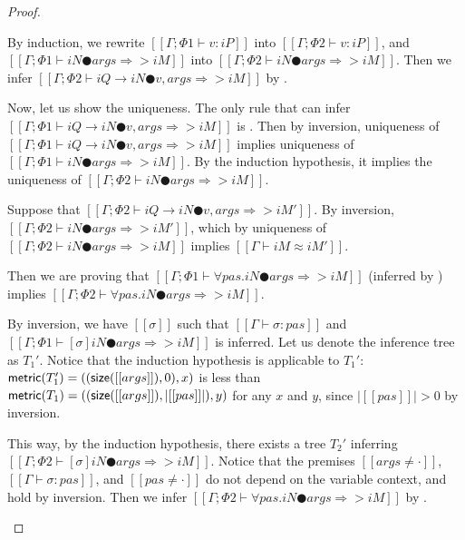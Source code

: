 \begin{proof}
\begin{caseof}
            By induction, we rewrite $[[Γ ; Φ1 ⊢ v : iP]]$ into $[[Γ ; Φ2 ⊢ v : iP]]$, 
            and $[[Γ ; Φ1 ⊢ iN ● args ⇒> iM]]$ into $[[Γ ; Φ2 ⊢ iN ● args ⇒> iM]]$.
            Then we infer $[[Γ ; Φ2 ⊢ iQ → iN ● v, args ⇒> iM]]$ by .

            Now, let us show the uniqueness.
            The only rule that can infer $[[Γ ; Φ1 ⊢ iQ → iN ● v, args ⇒> iM]]$
            is .
            Then by inversion, 
            uniqueness of $[[Γ ; Φ1 ⊢ iQ → iN ● v, args ⇒> iM]]$ implies
            uniqueness of $[[Γ ; Φ1 ⊢ iN ● args ⇒> iM]]$. By 
            the induction hypothesis, it implies the uniqueness of 
            $[[Γ ; Φ2 ⊢ iN ● args ⇒> iM]]$.


            Suppose that 
            $[[Γ ; Φ2 ⊢ iQ → iN ● v, args ⇒> iM']]$.
            By inversion, $[[Γ ; Φ2 ⊢ iN ● args ⇒> iM']]$, 
            which by uniqueness of $[[Γ ; Φ2 ⊢ iN ● args ⇒> iM]]$ implies
            $[[Γ ⊢ iM ≈ iM']]$.

        \item {}
            Then we are proving that
            $[[Γ ; Φ1 ⊢ ∀pas.iN ● args ⇒> iM]]$ (inferred by )
            implies $[[Γ ; Φ2 ⊢ ∀pas.iN ● args ⇒> iM]]$.

            By inversion, we have $[[σ]]$ such that $[[Γ ⊢ σ :{pas}]]$ and
            $[[Γ ; Φ1 ⊢ [σ]iN ● args ⇒> iM]]$ is inferred.
            Let us denote the inference tree as $T_1'$.
            Notice that the induction hypothesis is applicable to $T_1'$:
            $\mathsf{metric}(T_1') = ((\mathsf{size}([[args]]), 0), x)$ is less than 
            $\mathsf{metric}(T_1) = ((\mathsf{size}([[args]]), |[[pas]]|), y)$ for any $x$ and $y$,
            since $|[[pas]]| > 0$ by inversion.

            This way, by the induction hypothesis, 
            there exists a tree $T_2'$ inferring
            $[[Γ ; Φ2 ⊢ [σ]iN ● args ⇒> iM]]$.
            Notice that the premises $[[args ≠ ·]]$, $[[Γ ⊢ σ :{pas}]]$,
            and $[[pas ≠ ·]]$ do not depend on the variable context,
            and hold by inversion.
            Then we infer $[[Γ ; Φ2 ⊢ ∀pas.iN ● args ⇒> iM]]$ by .
    \end{caseof}
\end{proof}